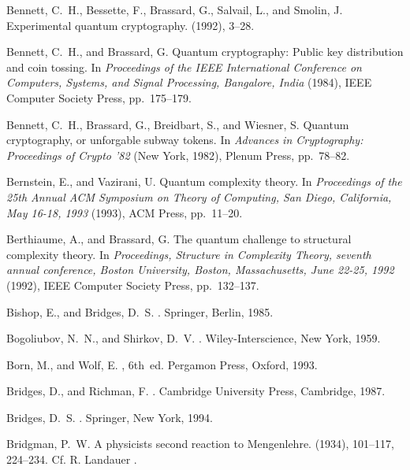 \begin{thebibliography}{100}
{\sc Bennett, C.~H., Bessette, F., Brassard, G., Salvail, L., and Smolin, J.}
\newblock Experimental quantum cryptography.
 (1992), 3--28.

{\sc Bennett, C.~H., and Brassard, G.}
\newblock Quantum cryptography: Public key distribution and coin tossing.
\newblock In {\em Proceedings of the IEEE International Conference on
  Computers, Systems, and Signal Processing, Bangalore, India\/} (1984), IEEE
  Computer Society Press, pp.~175--179.

{\sc Bennett, C.~H., Brassard, G., Breidbart, S., and Wiesner, S.}
\newblock Quantum cryptography, or unforgable subway tokens.
\newblock In {\em Advances in Cryptography: Proceedings of Crypto '82\/} (New
  York, 1982), Plenum Press, pp.~78--82.

{\sc Bernstein, E., and Vazirani, U.}
\newblock Quantum complexity theory.
\newblock In {\em Proceedings of the 25th Annual ACM Symposium on Theory of
  Computing, San Diego, California, May 16-18, 1993\/} (1993), ACM Press,
  pp.~11--20.

{\sc Berthiaume, A., and Brassard, G.}
\newblock The quantum challenge to structural complexity theory.
\newblock In {\em Proceedings, Structure in Complexity Theory, seventh annual
  conference, Boston University, Boston, Massachusetts, June 22-25, 1992\/}
  (1992), IEEE Computer Society Press, pp.~132--137.

{\sc Bishop, E., and Bridges, D.~S.}
.
\newblock Springer, Berlin, 1985.

{\sc Bogoliubov, N.~N., and Shirkov, D.~V.}
.
\newblock Wiley-Interscience, New York, 1959.

{\sc Born, M., and Wolf, E.}
, 6th~ed.
\newblock Pergamon Press, Oxford, 1993.

{\sc Bridges, D., and Richman, F.}
.
\newblock Cambridge University Press, Cambridge, 1987.

{\sc Bridges, D.~S.}
.
\newblock Springer, New York, 1994.

{\sc Bridgman, P.~W.}
\newblock A physicists second reaction to {M}engenlehre.
 (1934), 101--117, 224--234.
\newblock Cf. R. Landauer \cite{landauer-95}.


\end{thebibliography}
